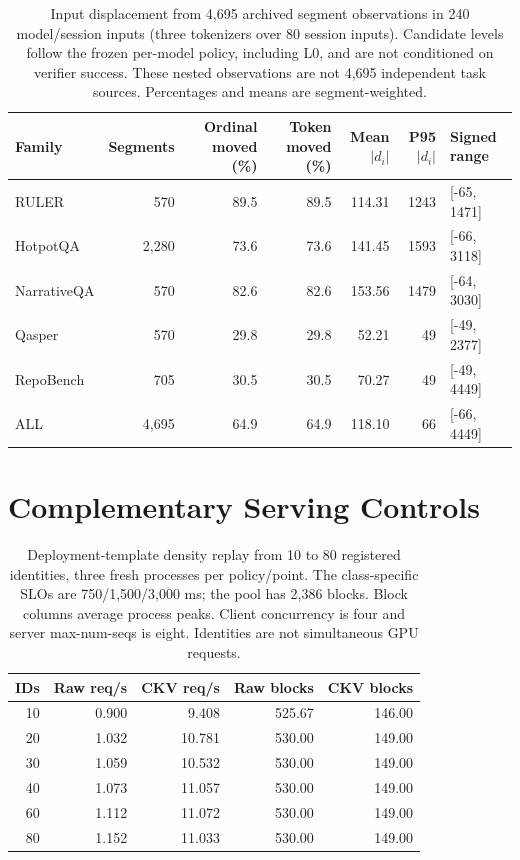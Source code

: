 \begin{table}[t]
\centering\small
\caption{Input displacement from 4,695 archived segment observations in 240 model/session inputs (three tokenizers over 80 session inputs). Candidate levels follow the frozen per-model policy, including L0, and are not conditioned on verifier success. These nested observations are not 4,695 independent task sources. Percentages and means are segment-weighted.}
\label{tab:s-displacement}
\begin{tabular}{@{}lrrrrrl@{}}
\toprule
Family & Segments & Ordinal moved (\%) & Token moved (\%) & Mean $|d_i|$ & P95 $|d_i|$ & Signed range\\
\midrule
RULER & 570 & 89.5 & 89.5 & 114.31 & 1243 & [-65, 1471]\\
HotpotQA & 2,280 & 73.6 & 73.6 & 141.45 & 1593 & [-66, 3118]\\
NarrativeQA & 570 & 82.6 & 82.6 & 153.56 & 1479 & [-64, 3030]\\
Qasper & 570 & 29.8 & 29.8 & 52.21 & 49 & [-49, 2377]\\
RepoBench & 705 & 30.5 & 30.5 & 70.27 & 49 & [-49, 4449]\\
ALL & 4,695 & 64.9 & 64.9 & 118.10 & 66 & [-66, 4449]\\
\bottomrule
\end{tabular}
\end{table}

\section{Complementary Serving Controls}
\label{sec:s-serving}
\begin{table}[t]
\centering\small
\caption{Deployment-template density replay from 10 to 80 registered identities, three fresh processes per policy/point. The class-specific SLOs are 750/1,500/3,000 ms; the pool has 2,386 blocks. Block columns average process peaks. Client concurrency is four and server max-num-seqs is eight. Identities are not simultaneous GPU requests.}
\label{tab:s-density}
\begin{tabular}{@{}rrrrr@{}}
\toprule
IDs & Raw req/s & CKV req/s & Raw blocks & CKV blocks\\
\midrule
10 & 0.900 & 9.408 & 525.67 & 146.00\\
20 & 1.032 & 10.781 & 530.00 & 149.00\\
30 & 1.059 & 10.532 & 530.00 & 149.00\\
40 & 1.073 & 11.057 & 530.00 & 149.00\\
60 & 1.112 & 11.072 & 530.00 & 149.00\\
80 & 1.152 & 11.033 & 530.00 & 149.00\\
\bottomrule
\end{tabular}
\end{table}

